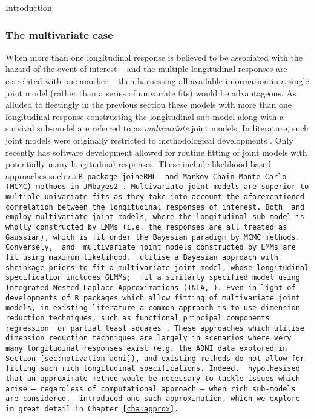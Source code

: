 \begin{chapter}{\label{cha:intro}Introduction}
  \subsubsection*{\label{sec:lit-mv}The multivariate case} 
  \addtocounter{subsubsection}{1}
  When more than one longitudinal response is believed to be associated with the hazard of the event of interest -- and the multiple longitudinal responses are correlated with one another -- then harnessing all available information in a single joint model (rather than a series of univariate fits) would be advantageous. As alluded to fleetingly in the previous section these models with more than one longitudinal response constructing the longitudinal sub-model along with a survival sub-model are referred to as \textit{multivariate} joint models. In literature, such joint models were originally restricted to methodological developments \citep{Lin2002}. Only recently has software development allowed for routine fitting of joint models with potentially many longitudinal responses. These include likelihood-based approaches such as \tt{R} package \tt{joineRML} \citep{Hickey2018} and Markov Chain Monte Carlo (MCMC) methods in \tt{JMbayes2} \citep{R-JMbayes2}.\newline
  Multivariate joint models are superior to multiple univariate fits as they take into account the aforementioned correlation between the longitudinal responses of interest. Both \citet{Andrinopoulou2020} and \citet{Long2018} employ multivariate joint models, where the longitudinal sub-model is wholly constructed by LMMs (i.e. the responses are all treated as Gaussian), which is fit under the Bayesian paradigm by MCMC methods. Conversely, \citet{Hickey2018} and \citet{Philipson2020} multivariate joint models constructed by LMMs are fit using maximum likelihood. \citet{PBCapp2} utilise a Bayesian approach with shrinkage priors to fit a multivariate joint model, whose longitudinal specification includes GLMMs; \citet{Rustand2023} fit a similarly specified model using Integrated Nested Laplace Approximations (INLA, \citet{R-INLA}).\newline
  Even in light of developments of \tt{R} packages which allow fitting of multivariate joint models, in existing literature a common approach is to use dimension reduction techniques, such as functional principal components regression \citep{Li2017B, Li2021} or partial least squares \citep{Wang2020}. These approaches which utilise dimension reduction techniques are largely in scenarios where very many longitudinal responses exist (e.g. the ADNI data explored in Section \ref{sec:motivation-adni}), and existing methods do not allow for fitting such rich longitudinal specifications. Indeed, \citet{Hickey2018} hypothesised that an approximate method would be necessary to tackle issues which arise -- regardless of computational approach -- when rich sub-models are considered. \citet{Bernhardt15} introduced one such approximation, which we explore in great detail in Chapter \ref{cha:approx}.


\end{chapter}
